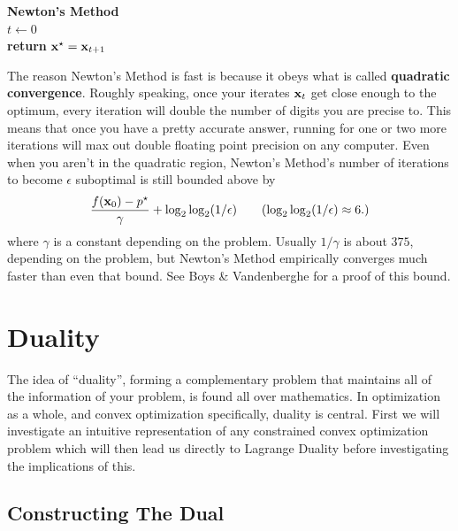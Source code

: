 \documentclass{article}
\begin{document}
\IncMargin{1em}
\begin{algorithm}
    \textbf{Newton's Method}\\
    $t \leftarrow 0$\\
    \textbf{return } ${\bf x}^\star = {\bf x}_{t+1}$
\end{algorithm}

The reason Newton's Method is fast is because it obeys what is called \textbf{quadratic
convergence}. Roughly speaking, once your iterates ${\bf x}_t$ get close enough to the optimum,
every iteration will double the number of digits you are precise to. This means that once
you have a pretty accurate answer, running for one or two more iterations will max out
double floating point precision on any computer. Even when you aren't in the quadratic region,
Newton's Method's number of iterations to become $\epsilon$ suboptimal is still bounded above
by
\[
    \frac{f({\bf x}_0)-p^\star}{\gamma} + \log_2\log_2(1/\epsilon) \tag{$\log_2\log_2(1/\epsilon)\approx6.$}
\]
where $\gamma$ is a constant depending on the problem. Usually $1/\gamma$ is about $375$,
depending on the problem, but Newton's Method empirically converges much faster than even
that bound. See Boys \& Vandenberghe for a proof of this bound.

\section{Duality}

The idea of ``duality'', forming a complementary problem that maintains
all of the information of your problem, is found all over mathematics.
In optimization as a whole, and convex optimization specifically, duality
is central. First we will investigate an intuitive representation of any
constrained convex optimization problem which will then lead us directly to
Lagrange Duality before investigating the implications of this.

\subsection{Constructing The Dual}
\end{document}
